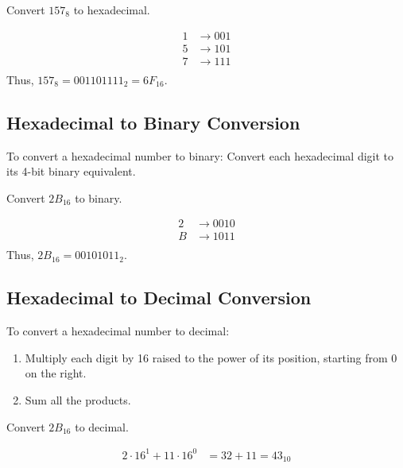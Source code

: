 \begin{example}Convert \(157_8\) to hexadecimal.

\begin{solution}

\[
\begin{aligned}
1 & \rightarrow 001 \\
5 & \rightarrow 101 \\
7 & \rightarrow 111 \\
\end{aligned}
\]
Thus, \(157_8 = 001101111_2 = 6F_{16}\). \end{solution}
\end{example}

\subsection*{Hexadecimal to Binary Conversion}
To convert a hexadecimal number to binary: Convert each hexadecimal digit to its 4-bit binary equivalent.

\begin{example}Convert \(2B_{16}\) to binary.

\begin{solution}
    


\[
\begin{aligned}
2 & \rightarrow 0010 \\
B & \rightarrow 1011 \\
\end{aligned}
\]
Thus, \(2B_{16} = 00101011_2\).\end{solution}

\end{example}

\subsection*{Hexadecimal to Decimal Conversion}
To convert a hexadecimal number to decimal:
\begin{enumerate}
    \item Multiply each digit by 16 raised to the power of its position, starting from 0 on the right.
    \item Sum all the products.
\end{enumerate}

\begin{example}Convert \(2B_{16}\) to decimal.

\begin{solution}
\[
\begin{aligned}
2 \cdot 16^1 + 11 \cdot 16^0 & = 32 + 11 = 43_{10}
\end{aligned}
\] \end{solution}
\end{example}

